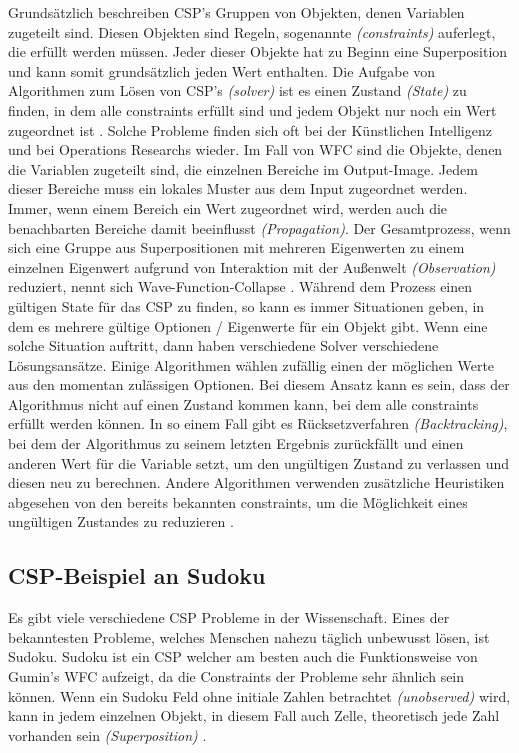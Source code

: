 \documentclass[12pt, a4paper,twoside,openany]{report} %
\begin{document}
Grundsätzlich beschreiben CSP's Gruppen von Objekten, denen Variablen zugeteilt sind.
Diesen Objekten sind Regeln, sogenannte \textit{(constraints)} auferlegt, die erfüllt werden müssen.
Jeder dieser Objekte hat zu Beginn eine Superposition und kann somit grundsätzlich jeden Wert enthalten.
Die Aufgabe von Algorithmen zum Lösen von CSP's \textit{(solver)} ist es einen Zustand \textit{(State)} zu finden,
in dem alle constraints erfüllt sind und jedem Objekt nur noch ein Wert zugeordnet ist \cite{Lecoutre2009ConstraintNT}.
Solche Probleme finden sich oft bei der Künstlichen Intelligenz und bei Operations Researchs wieder.
Im Fall von WFC sind die Objekte, denen die Variablen zugeteilt sind, die einzelnen Bereiche im Output-Image.
Jedem dieser Bereiche muss ein lokales Muster aus dem Input zugeordnet werden.
Immer, wenn einem Bereich ein Wert zugeordnet wird, werden auch die benachbarten Bereiche damit beeinflusst \textit{(Propagation)}.
Der Gesamtprozess, wenn sich eine Gruppe aus Superpositionen mit mehreren Eigenwerten zu einem einzelnen Eigenwert aufgrund von Interaktion mit der Außenwelt \textit{(Observation)} reduziert,
nennt sich Wave-Function-Collapse \cite{Zinkernagel_2016}.
Während dem Prozess einen gültigen State für das CSP zu finden, so kann es immer Situationen geben, in dem es mehrere gültige Optionen / Eigenwerte für ein Objekt gibt.
Wenn eine solche Situation auftritt, dann haben verschiedene Solver verschiedene Lösungsansätze.
Einige Algorithmen wählen zufällig einen der möglichen Werte aus den momentan zulässigen Optionen.
Bei diesem Ansatz kann es sein, dass der Algorithmus nicht auf einen Zustand kommen kann, bei dem alle constraints erfüllt werden können.
In so einem Fall gibt es Rücksetzverfahren \textit{(Backtracking)}, bei dem der Algorithmus zu seinem letzten Ergebnis zurückfällt und einen anderen Wert für die Variable setzt,
um den ungültigen Zustand zu verlassen und diesen neu zu berechnen.
Andere Algorithmen verwenden zusätzliche Heuristiken abgesehen von den bereits bekannten constraints, um die Möglichkeit eines ungültigen Zustandes zu reduzieren \cite{Karth2017WaveFunctionCollapseIC}.
\pagebreak

\subsection{CSP-Beispiel an Sudoku}
Es gibt viele verschiedene CSP Probleme in der Wissenschaft.
Eines der bekanntesten Probleme, welches Menschen nahezu täglich unbewusst lösen, ist Sudoku.
Sudoku ist ein CSP welcher am besten auch die Funktionsweise von Gumin's WFC aufzeigt, da die Constraints der Probleme sehr ähnlich sein können.
Wenn ein Sudoku Feld ohne initiale Zahlen betrachtet \textit{(unobserved)} wird, kann in jedem einzelnen Objekt,
in diesem Fall auch Zelle, theoretisch jede Zahl vorhanden sein \textit{(Superposition)} \cite{boris}.
\end{document}
